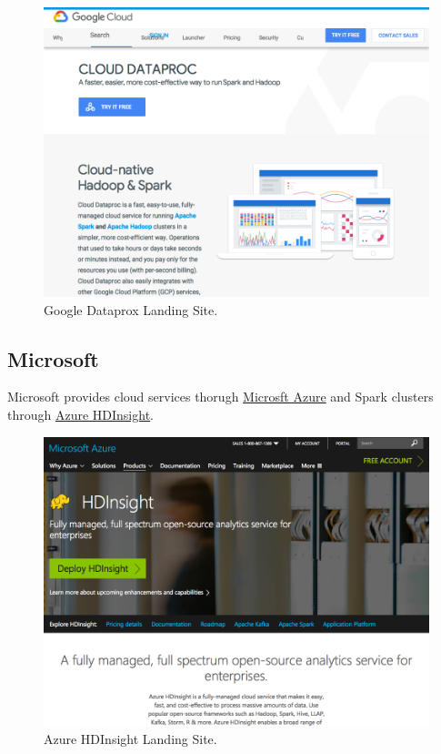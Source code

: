 \documentclass[]{book}
\theoremstyle{definition}
\theoremstyle{definition}
\theoremstyle{definition}
\theoremstyle{remark}
\begin{document}
\begin{figure}

{\centering \includegraphics[width=13.78in]{images/05-clusters-dataproc} 

}

\caption{Google Dataprox Landing Site.}\label{fig:google-dataproc}
\end{figure}

\hypertarget{microsoft}{%
\subsection{Microsoft}\label{microsoft}}

Microsoft provides cloud services thorugh
\href{https://azure.microsoft.com/}{Microsft Azure} and Spark clusters
through
\href{https://azure.microsoft.com/en-us/services/hdinsight/}{Azure
HDInsight}.

\begin{figure}

{\centering \includegraphics[width=13.78in]{images/05-clusters-azure} 

}

\caption{Azure HDInsight Landing Site.}\label{fig:azure-hdinsight}
\end{figure}
\end{document}
